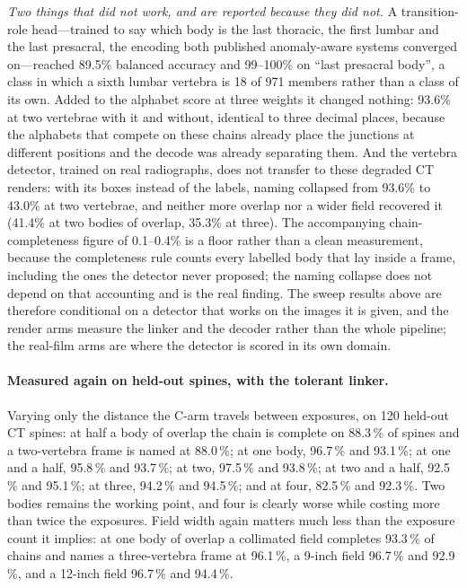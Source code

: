 \documentclass[11pt,letterpaper]{article}
\begin{document}
\emph{Two things that did not work, and are reported because they did not.} A transition-role head---trained to say which body is the last thoracic, the first lumbar and the last presacral, the encoding both published anomaly-aware systems converged on---reached 89.5\% balanced accuracy and 99--100\% on ``last presacral body'', a class in which a sixth lumbar vertebra is 18 of 971 members rather than a class of its own. Added to the alphabet score at three weights it changed nothing: 93.6\% at two vertebrae with it and without, identical to three decimal places, because the alphabets that compete on these chains already place the junctions at different positions and the decode was already separating them. And the vertebra detector, trained on real radiographs, does not transfer to these degraded CT renders: with its boxes instead of the labels, naming collapsed from 93.6\% to 43.0\% at two vertebrae, and neither more overlap nor a wider field recovered it (41.4\% at two bodies of overlap, 35.3\% at three). The accompanying chain-completeness figure of 0.1--0.4\% is a floor rather than a clean measurement, because the completeness rule counts every labelled body that lay inside a frame, including the ones the detector never proposed; the naming collapse does not depend on that accounting and is the real finding. The sweep results above are therefore conditional on a detector that works on the images it is given, and the render arms measure the linker and the decoder rather than the whole pipeline; the real-film arms are where the detector is scored in its own domain.



\paragraph{Measured again on held-out spines, with the tolerant linker.} Varying only the distance the C-arm travels between exposures, on 120 held-out CT spines: at half a body of overlap the chain is complete on 88.3\,\% of spines and a two-vertebra frame is named at 88.0\,\%; at one body, 96.7\,\% and 93.1\,\%; at one and a half, 95.8\,\% and 93.7\,\%; at two, 97.5\,\% and 93.8\,\%; at two and a half, 92.5\,\% and 95.1\,\%; at three, 94.2\,\% and 94.5\,\%; and at four, 82.5\,\% and 92.3\,\%. Two bodies remains the working point, and four is clearly worse while costing more than twice the exposures. Field width again matters much less than the exposure count it implies: at one body of overlap a collimated field completes 93.3\,\% of chains and names a three-vertebra frame at 96.1\,\%, a 9-inch field 96.7\,\% and 92.9\,\%, and a 12-inch field 96.7\,\% and 94.4\,\%.
\end{document}
